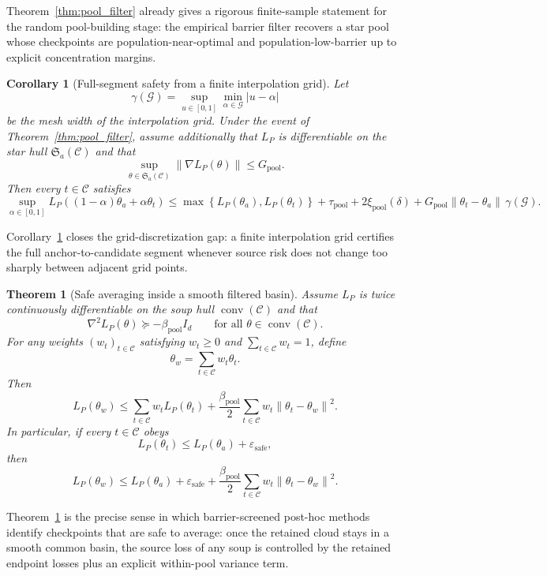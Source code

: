 \documentclass{article}
\newtheorem{theorem}{Theorem}
\newtheorem{corollary}{Corollary}
\newcommand{\cC}{\mathcal{C}}
\newcommand{\norm}[1]{\left\lVert #1 \right\rVert}
\newcommand{\abs}[1]{\left\lvert #1 \right\rvert}
\newcommand{\paren}[1]{\left( #1 \right)}
\newcommand{\braces}[1]{\left\{ #1 \right\}}
\begin{document}
Theorem~\ref{thm:pool_filter} already gives a rigorous finite-sample statement for the random pool-building stage: the empirical barrier filter recovers a star pool whose checkpoints are population-near-optimal and population-low-barrier up to explicit concentration margins.

\begin{corollary}[Full-segment safety from a finite interpolation grid]
\label{cor:segment_barrier}
Let
\[
\gamma(\mathcal G)
=
\sup_{u\in[0,1]} \min_{\alpha\in\mathcal G} \abs{u-\alpha}
\]
be the mesh width of the interpolation grid. Under the event of Theorem~\ref{thm:pool_filter}, assume additionally that \(L_P\) is differentiable on the star hull \(\mathfrak{S}_a(\cC)\) and that
\[
\sup_{\theta\in \mathfrak{S}_a(\cC)} \norm{\nabla L_P(\theta)} \le G_{\mathrm{pool}}.
\]
Then every \(t\in\cC\) satisfies
\[
\sup_{\alpha\in[0,1]}
L_P\paren{(1-\alpha)\theta_a + \alpha \theta_t}
\le
\max\braces{L_P(\theta_a),L_P(\theta_t)}
+
\tau_{\mathrm{pool}} + 2\xi_{\mathrm{pool}}(\delta)
+
G_{\mathrm{pool}} \norm{\theta_t-\theta_a}\,\gamma(\mathcal G).
\]
\end{corollary}

Corollary~\ref{cor:segment_barrier} closes the grid-discretization gap: a finite interpolation grid certifies the full anchor-to-candidate segment whenever source risk does not change too sharply between adjacent grid points.

\begin{theorem}[Safe averaging inside a smooth filtered basin]
\label{thm:soup_safe}
Assume \(L_P\) is twice continuously differentiable on the soup hull \(\operatorname{conv}(\cC)\) and that
\[
\nabla^2 L_P(\theta) \succeq -\beta_{\mathrm{pool}} I_d
\qquad
\text{for all } \theta\in\operatorname{conv}(\cC).
\]
For any weights \((w_t)_{t\in\cC}\) satisfying \(w_t\ge 0\) and \(\sum_{t\in\cC} w_t=1\), define
\[
\theta_w = \sum_{t\in\cC} w_t \theta_t.
\]
Then
\[
L_P(\theta_w)
\le
\sum_{t\in\cC} w_t L_P(\theta_t)
+
\frac{\beta_{\mathrm{pool}}}{2}
\sum_{t\in\cC} w_t \norm{\theta_t-\theta_w}^2.
\]
In particular, if every \(t\in\cC\) obeys
\[
L_P(\theta_t) \le L_P(\theta_a) + \varepsilon_{\mathrm{safe}},
\]
then
\[
L_P(\theta_w)
\le
L_P(\theta_a)
+
\varepsilon_{\mathrm{safe}}
+
\frac{\beta_{\mathrm{pool}}}{2}
\sum_{t\in\cC} w_t \norm{\theta_t-\theta_w}^2.
\]
\end{theorem}

Theorem~\ref{thm:soup_safe} is the precise sense in which barrier-screened post-hoc methods identify checkpoints that are safe to average: once the retained cloud stays in a smooth common basin, the source loss of any soup is controlled by the retained endpoint losses plus an explicit within-pool variance term.
\end{document}
